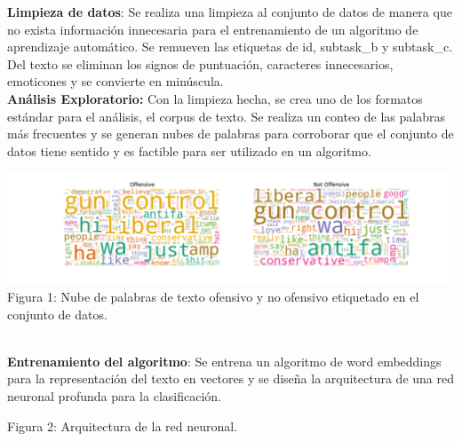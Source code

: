 \documentclass[a0paper,portrait]{baposter}
\begin{document}
\begin{poster}
{\textbf{Limpieza de datos}: Se realiza una limpieza al conjunto de datos de manera que no exista información innecesaria para el entrenamiento de un algoritmo de aprendizaje automático. Se remueven las etiquetas de id, subtask\_b y subtask\_c. Del texto se eliminan los signos de puntuación, caracteres innecesarios, emoticones y se convierte en minúscula. \\

\textbf{Análisis Exploratorio:} Con la limpieza hecha, se crea uno de los formatos estándar para el análisis, el corpus de texto. Se realiza un conteo de las palabras más frecuentes y se generan nubes de palabras para corroborar que el conjunto de datos tiene sentido y es factible para ser utilizado en un algoritmo.

\begin{center}
    \includegraphics[width=145mm]{word_clouds.png} \\ 
    \caption{Figura 1: Nube de palabras de texto ofensivo y no ofensivo etiquetado en el conjunto de datos.}
\end{center} \\

\textbf{Entrenamiento del algoritmo}: Se entrena un algoritmo de word embeddings para la representación del texto en vectores y se diseña la arquitectura de una red neuronal profunda para la clasificación. 

\begin{center}
\hspace{4cm}
\end{center}
\begin{center}
\caption{Figura 2: Arquitectura de la red neuronal.}
\end{center}
} 



\end{poster}
\end{document}
